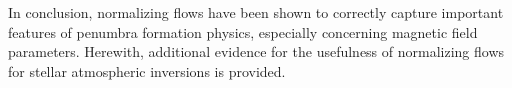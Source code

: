 \documentclass[a4paper,11pt]{report}
\begin{document}
In conclusion, normalizing flows have been shown to correctly capture important features of penumbra formation physics, especially concerning magnetic field parameters. Herewith, additional evidence for the usefulness of normalizing flows for stellar atmospheric inversions is provided.

\end{document}
